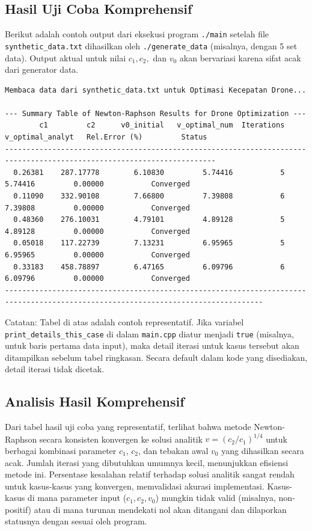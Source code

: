 \documentclass[conference]{IEEEtran}
\begin{document}
\subsection{Hasil Uji Coba Komprehensif}
\vspace{-0.5cm} %
Berikut adalah contoh output dari eksekusi program \texttt{./main} setelah file \texttt{synthetic\_data.txt} dihasilkan oleh \texttt{./generate\_data} (misalnya, dengan 5 set data). Output aktual untuk nilai $c_1, c_2,$ dan $v_0$ akan bervariasi karena sifat acak dari generator data.
\begingroup
\tiny
\begin{verbatim}
Membaca data dari synthetic_data.txt untuk Optimasi Kecepatan Drone...

--- Summary Table of Newton-Raphson Results for Drone Optimization ---
        c1         c2      v0_initial   v_optimal_num  Iterations  v_optimal_analyt   Rel.Error (%)         Status
-----------------------------------------------------------------------------------------------------------------------
  0.26381    287.17778        6.10830         5.74416           5         5.74416         0.00000           Converged
  0.11090    332.90108        7.66800         7.39808           6         7.39808         0.00000           Converged
  0.48360    276.10031        4.79101         4.89128           5         4.89128         0.00000           Converged
  0.05018    117.22739        7.13231         6.95965           5         6.95965         0.00000           Converged
  0.33183    458.78897        6.47165         6.09796           6         6.09796         0.00000           Converged
----------------------------------------------------------------------------------------------------------------------------------
\end{verbatim}
\endgroup
Catatan: Tabel di atas adalah contoh representatif. Jika variabel \texttt{print\_details\_this\_case} di dalam \texttt{main.cpp} diatur menjadi \texttt{true} (misalnya, untuk baris pertama data input), maka detail iterasi untuk kasus tersebut akan ditampilkan sebelum tabel ringkasan. Secara default dalam kode yang disediakan, detail iterasi tidak dicetak.

\subsection{Analisis Hasil Komprehensif}
Dari tabel hasil uji coba yang representatif, terlihat bahwa metode Newton-Raphson secara konsisten konvergen ke solusi analitik $v = (c_2/c_1)^{1/4}$ untuk berbagai kombinasi parameter $c_1$, $c_2$, dan tebakan awal $v_0$ yang dihasilkan secara acak. Jumlah iterasi yang dibutuhkan umumnya kecil, menunjukkan efisiensi metode ini. Persentase kesalahan relatif terhadap solusi analitik sangat rendah untuk kasus-kasus yang konvergen, memvalidasi akurasi implementasi. Kasus-kasus di mana parameter input ($c_1, c_2, v_0$) mungkin tidak valid (misalnya, non-positif) atau di mana turunan mendekati nol akan ditangani dan dilaporkan statusnya dengan sesuai oleh program.
\end{document}
